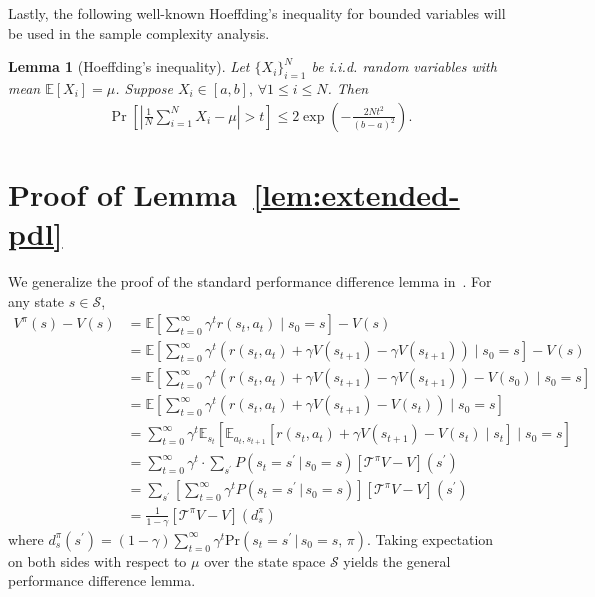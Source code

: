 \documentclass[10pt]{article}
\newcommand{\calS}{\mathcal{S}}
\newcommand{\calT}{\mathcal{T}}
\newcommand{\E}{\mathbb{E}}
\newcommand{\ls}{\left}
\newcommand{\rs}{\right}
\newcommand{\prob}{\mathrm{Pr}}
\theoremstyle{plain}
\newtheorem{lemma}[theorem]{Lemma}
\theoremstyle{definition}
\begin{document}
Lastly, the following  well-known Hoeffding's inequality for bounded variables will be used in the sample complexity analysis.
\begin{lemma}[Hoeffding's inequality]
    Let $\{X_i\}_{i=1}^N$ be i.i.d. random variables with mean $\E [X_i] = \mu$. Suppose  $X_i \in [a,b],\,\forall 1\leq i\leq N$. Then
    \begin{align*}
        \Pr \ls[ \ls| \frac{1}{N} \sum_{i=1}^N X_i - \mu \rs| > t \rs] \leq 2 \exp \ls( -\frac{2Nt^2}{(b-a)^2} \rs).
    \end{align*}
    \label{lem:hoeffding}
\end{lemma}



\section{Proof of Lemma~\ref{lem:extended-pdl}}
\label{sec:pf:lem:extended-pdl}
We generalize the proof of the standard performance difference lemma in~\cite{Agarwal_Kakade_Lee_Mahajan_2019}. For any state $s \in \calS$,
\begin{align*}
    V^{\pi}(s) - V(s) &= \E  \ls[ \sum_{t=0}^\infty \gamma^t r(s_t, a_t) \; \Big| \; s_0=s \rs] - V(s) \\
    &= \E  \ls[ \sum_{t=0}^\infty \gamma^t \ls( r(s_t, a_t) + \gamma V(s_{t+1}) - \gamma V(s_{t+1}) \rs) \; \Big | \; s_0=s \rs] - V(s) \\
    &= \E  \ls[ \sum_{t=0}^\infty \gamma^t \ls( r(s_t, a_t) + \gamma V(s_{t+1}) - \gamma V(s_{t+1}) \rs) - V(s_0) \; \Big | \; s_0=s  \rs] \\
    &= \E  \ls[ \sum_{t=0}^\infty \gamma^t \ls( r(s_t, a_t) + \gamma V(s_{t+1}) - V(s_{t}) \rs) \; \Big | \; s_0=s  \rs] \\
    &= \sum_{t=0}^\infty \gamma^t \E_{s_t} \ls[ \E_{a_t, s_{t+1}} \ls[ r(s_t,a_t) + \gamma V(s_{t+1}) - V(s_t) \; \Big | \; s_t \rs] \; \Big | \; s_0 = s \rs] \\
    &= \sum_{t=0}^\infty \gamma^t \cdot \sum_{s^\prime} P(s_t=s^\prime \, | \, s_0=s) \ls[ \calT^\pi V - V \rs](s^\prime) \\
    &= \sum_{s^\prime} \ls[ \sum_{t=0}^\infty \gamma^t P(s_t = s^\prime \, | \, s_0 = s) \rs]  \ls[ \calT^\pi V - V \rs] (s^\prime) \\
    &= \frac{1}{1-\gamma} \ls[ \calT^\pi V - V \rs](d^\pi_s)
\end{align*}
where $d_s^\pi(s^\prime) = (1-\gamma) \sum_{t=0}^\infty \gamma^t \prob(s_t=s^\prime\, |\, s_0=s, \, \pi) $. 
Taking expectation on both sides with respect to $\mu$ over the state space $\calS$ yields the general performance difference lemma.
\end{document}
